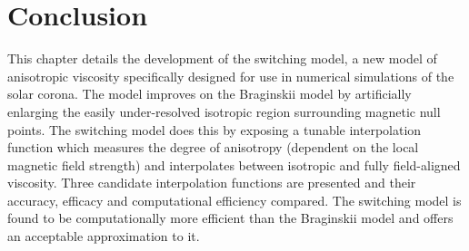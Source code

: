 

\section{Conclusion}

This chapter details the development of the switching model, a new model of anisotropic viscosity specifically designed for use in numerical simulations of the solar corona. The model improves on the Braginskii model by artificially enlarging the easily under-resolved isotropic region surrounding magnetic null points. The switching model does this by exposing a tunable interpolation function which measures the degree of anisotropy (dependent on the local magnetic field strength) and interpolates between isotropic and fully field-aligned viscosity. Three candidate interpolation functions are presented and their accuracy, efficacy and computational efficiency compared. The switching model is found to be computationally more efficient than the Braginskii model and offers an acceptable approximation to it. 
